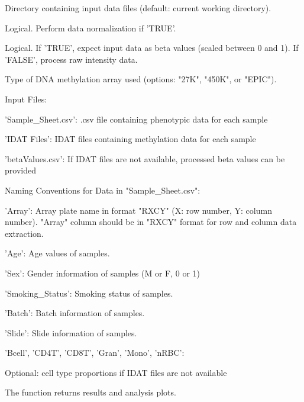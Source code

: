 \documentclass[a4paper]{book}
\begin{document}
%
\begin{Arguments}
\begin{ldescription}
\item[\code{directory}] 
Directory containing input data files (default: current working directory).


\item[\code{normalize}] 
Logical. Perform data normalization if 'TRUE'.


\item[\code{useBeta}] 
Logical. If 'TRUE', expect input data as beta values (scaled between 0 and 1). If 'FALSE', process raw intensity data.


\item[\code{arrayType}] 
Type of DNA methylation array used (options: "27K", "450K", or "EPIC").

\end{ldescription}
\end{Arguments}
%
\begin{Details}
Input Files:

'Sample\_Sheet.csv':
.csv file containing phenotypic data for each sample

'IDAT Files':
IDAT files containing methylation data for each sample

'betaValues.csv':
If IDAT files are not available, processed beta values can be provided

Naming Conventions for Data in "Sample\_Sheet.csv":

'Array':
Array plate name in format "RXCY" (X: row number, Y: column number).
"Array" column should be in "RXCY" format for row and column data extraction.

'Age':
Age values of samples.

'Sex':
Gender information of samples (M or F, 0 or 1)

'Smoking\_Status':
Smoking status of samples.

'Batch':
Batch information of samples.

'Slide':
Slide information of samples.

'Bcell', 'CD4T', 'CD8T', 'Gran', 'Mono', 'nRBC':

Optional: cell type proportions if IDAT files are not available
\end{Details}
%
\begin{Value}
The function returns results and analysis plots.
\end{Value}
\printindex{}
\end{document}
